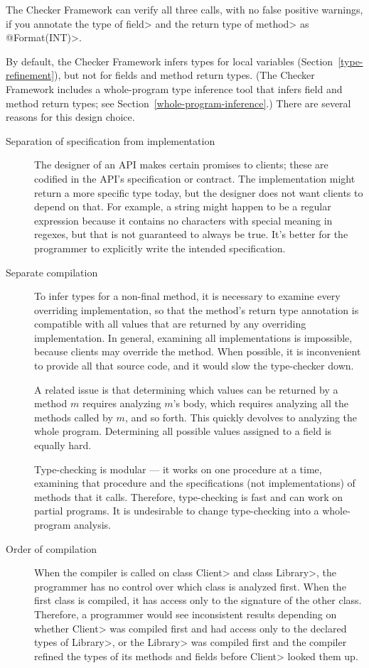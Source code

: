 The Checker Framework can verify all three calls, with no false positive
warnings, if you annotate the type of \<field> and the return type of
\<method> as \<@Format(INT)>.

By default, the Checker Framework infers types for local variables
(Section~\ref{type-refinement}), but not for fields and method return
types.  (The Checker Framework includes a whole-program type inference tool
that infers field and method return types; see
Section~\ref{whole-program-inference}.)
There are several reasons for this design choice.

\begin{description}
\item[Separation of specification from implementation]
  The designer of an API makes certain promises to clients; these are
  codified in the API's specification or contract.  The implementation
  might return a more specific type today, but the designer does not want
  clients to depend on that.  For example, a string might happen to be a
  regular expression because it contains no characters with special meaning
  in regexes, but that is not guaranteed to always be true.  It's better
  for the programmer to explicitly write the intended specification.

\item[Separate compilation]
  To infer types for a non-final method, it is necessary to examine every
  overriding implementation, so that the method's return type annotation is
  compatible with all values that are returned by any overriding
  implementation.  In general, examining all implementations is impossible,
  because clients may override the method.  When possible, it is
  inconvenient to provide all that source code, and it would slow the
  type-checker down.

  A related issue is that determining which values can be returned by a
  method $m$ requires analyzing $m$'s body, which requires analyzing
  all the methods called by $m$, and so forth.  This quickly devolves to
  analyzing the whole program.
  Determining all possible values assigned to a field is equally hard.

  Type-checking is modular --- it works on one procedure at a time,
  examining that procedure and the specifications (not implementations) of
  methods that it calls.  Therefore, type-checking is fast and can work on
  partial programs.  It is undesirable to change type-checking into a
  whole-program analysis.

\item[Order of compilation]
  When the compiler is called on class \<Client> and class \<Library>, the
  programmer has no control over which class is analyzed first.  When the
  first class is compiled, it has access only to the signature of the other
  class.  Therefore, a programmer would see inconsistent results depending
  on whether \<Client> was compiled first and had access only to the
  declared types of \<Library>, or the \<Library> was compiled first and
  the compiler refined the types of its methods and fields before \<Client>
  looked them up.


\end{description}
